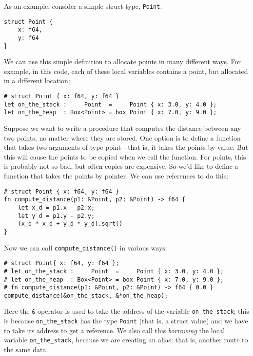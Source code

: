 \documentclass[]{article}
\begin{document}
As an example, consider a simple struct type, \texttt{Point}:

\begin{verbatim}
struct Point {
    x: f64,
    y: f64
}
\end{verbatim}

We can use this simple definition to allocate points in many different
ways. For example, in this code, each of these local variables contains
a point, but allocated in a different location:

\begin{verbatim}
# struct Point { x: f64, y: f64 }
let on_the_stack :     Point  =     Point { x: 3.0, y: 4.0 };
let on_the_heap  : Box<Point> = box Point { x: 7.0, y: 9.0 };
\end{verbatim}

Suppose we want to write a procedure that computes the distance between
any two points, no matter where they are stored. One option is to define
a function that takes two arguments of type point---that is, it takes
the points by value. But this will cause the points to be copied when we
call the function. For points, this is probably not so bad, but often
copies are expensive. So we'd like to define a function that takes the
points by pointer. We can use references to do this:

\begin{verbatim}
# struct Point { x: f64, y: f64 }
fn compute_distance(p1: &Point, p2: &Point) -> f64 {
    let x_d = p1.x - p2.x;
    let y_d = p1.y - p2.y;
    (x_d * x_d + y_d * y_d).sqrt()
}
\end{verbatim}

Now we can call \texttt{compute\_distance()} in various ways:

\begin{verbatim}
# struct Point{ x: f64, y: f64 };
# let on_the_stack :     Point  =     Point { x: 3.0, y: 4.0 };
# let on_the_heap  : Box<Point> = box Point { x: 7.0, y: 9.0 };
# fn compute_distance(p1: &Point, p2: &Point) -> f64 { 0.0 }
compute_distance(&on_the_stack, &*on_the_heap);
\end{verbatim}

Here the \texttt{\&} operator is used to take the address of the
variable \texttt{on\_the\_stack}; this is because
\texttt{on\_the\_stack} has the type \texttt{Point} (that is, a struct
value) and we have to take its address to get a reference. We also call
this \emph{borrowing} the local variable \texttt{on\_the\_stack},
because we are creating an alias: that is, another route to the same
data.
\end{document}

